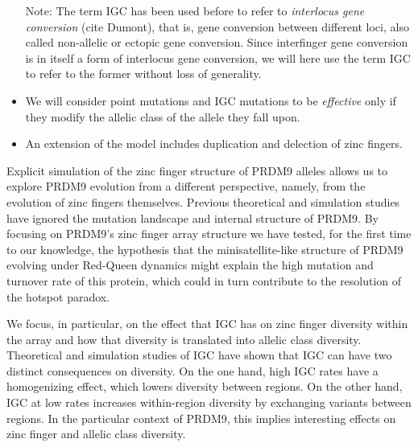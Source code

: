 \documentclass[a4paper,10pt]{article}
\begin{document}
\begin{itemize}
 Note: The term IGC has been used before to refer to \textit{interlocus gene conversion} \cite{Hartasanchez2014} (cite Dumont), that is, gene conversion between different loci, also called non-allelic or ectopic gene conversion. Since interfinger gene conversion is in itself a form of interlocus gene conversion, we will here use the term IGC to refer to the former without loss of generality. 
 \item We will consider point mutations and IGC mutations to be \textit{effective} only if they modify the allelic class of the allele they fall upon. 
 \item An extension of the model includes duplication and delection of zinc fingers.
\end{itemize}


 
  
 Explicit simulation of the zinc finger structure of PRDM9 alleles allows us to explore PRDM9 evolution from a different perspective, namely, from the evolution of zinc fingers themselves. Previous theoretical and simulation studies \cite{Latrille2017, Ubeda2019} have ignored the mutation landscape and internal structure of PRDM9.
 By focusing on PRDM9's zinc finger array structure we have tested, for the first time to our knowledge, the hypothesis that the minisatellite-like structure of PRDM9 evolving under Red-Queen dynamics might explain the high mutation and turnover rate of this protein, which could in turn contribute to the resolution of the hotspot paradox. 
 
We focus, in particular, on the effect that IGC has on zinc finger diversity within the array and how that diversity is translated into allelic class diversity. Theoretical and simulation studies of IGC \cite{Innan2003, Hartasanchez2014} have shown that IGC can have two distinct consequences on diversity. On the one hand, high IGC rates have a homogenizing effect, which lowers diversity between regions. On the other hand, IGC at low rates increases within-region diversity by exchanging variants between regions. In the particular context of PRDM9, this implies interesting effects on zinc finger and allelic class diversity. 
  
\end{document}
